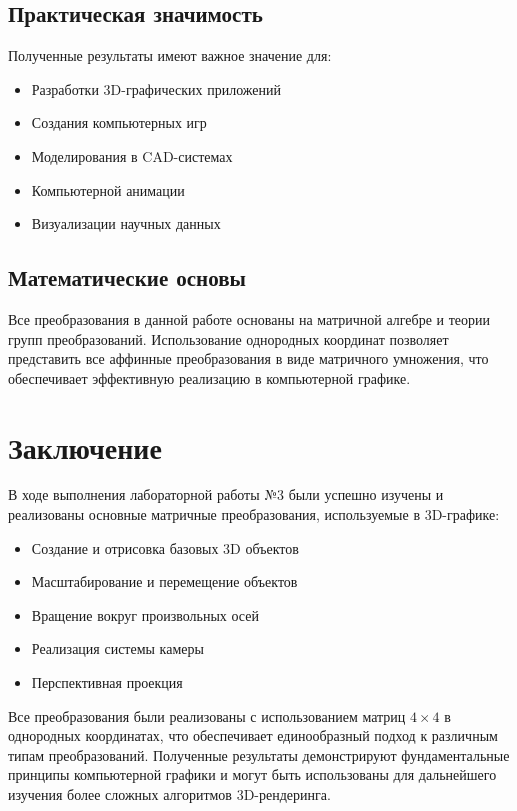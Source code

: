 \subsection*{Практическая значимость}

Полученные результаты имеют важное значение для:

\begin{itemize}
\item Разработки 3D-графических приложений
\item Создания компьютерных игр
\item Моделирования в CAD-системах
\item Компьютерной анимации
\item Визуализации научных данных
\end{itemize}

\subsection*{Математические основы}

Все преобразования в данной работе основаны на матричной алгебре и теории групп преобразований. Использование однородных координат позволяет представить все аффинные преобразования в виде матричного умножения, что обеспечивает эффективную реализацию в компьютерной графике.

\section*{Заключение}

В ходе выполнения лабораторной работы №3 были успешно изучены и реализованы основные матричные преобразования, используемые в 3D-графике:

\begin{itemize}
\item Создание и отрисовка базовых 3D объектов
\item Масштабирование и перемещение объектов
\item Вращение вокруг произвольных осей
\item Реализация системы камеры
\item Перспективная проекция
\end{itemize}

Все преобразования были реализованы с использованием матриц $4 \times 4$ в однородных координатах, что обеспечивает единообразный подход к различным типам преобразований. Полученные результаты демонстрируют фундаментальные принципы компьютерной графики и могут быть использованы для дальнейшего изучения более сложных алгоритмов 3D-рендеринга.
